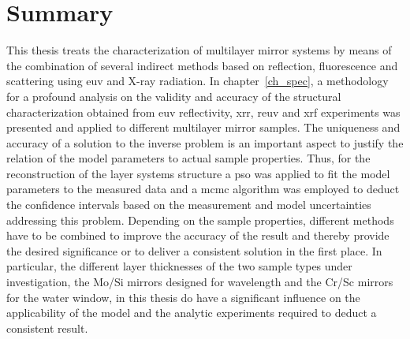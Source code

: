 \chapter{Summary} \label{ch_summary}
This thesis treats the characterization of multilayer mirror systems by means of the combination of several indirect methods based on reflection, fluorescence and scattering using \gls{euv} and X-ray radiation. In chapter~\ref{ch_spec}, a methodology for a profound analysis on the validity and accuracy of the structural characterization obtained from \glsdesc{euv} reflectivity, \glsdesc{xrr}, \glsdesc{reuv} and \glsdesc{xrf} experiments was presented and applied to different multilayer mirror samples. The uniqueness and accuracy of a solution to the inverse problem is an important aspect to justify the relation of the model parameters to actual sample properties. Thus, for the reconstruction of the layer systems structure a \glsdesc{pso} was applied to fit the model parameters to the measured data and a \glsdesc{mcmc} algorithm was employed to deduct the confidence intervals based on the measurement and model uncertainties addressing this problem. Depending on the sample properties, different methods have to be combined to improve the accuracy of the result and thereby provide the desired significance or to deliver a consistent solution in the first place. In particular, the different layer thicknesses of the two sample types under investigation, the Mo/Si mirrors designed for  wavelength and the Cr/Sc mirrors for the water window, in this thesis do have a significant influence on the applicability of the model and the analytic experiments required to deduct a consistent result.

